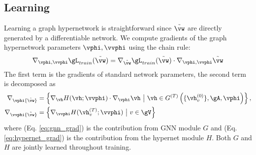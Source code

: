 \documentclass{article} %
\begin{document}
\subsection{Learning}
Learning a graph hypernetwork is straightforward since $\tilde{\vw}$ are directly generated by a
differentiable network. We compute gradients of the graph hypernetwork parameters $\vphi, \vvphi$
using the chain rule:
\begin{equation}
\nabla_{\vphi, \vvphi}{\gL_{train}(\tilde{\vw})} = \nabla_{\tilde{\vw}}{
\gL_{train}(\tilde{\vw})} \cdot \nabla_{\vphi, \vvphi}{\tilde{\vw}}
\end{equation}
The first term is the gradients of standard network parameters, the second term is decomposed as\begin{align}
 \nabla_\vphi{\tilde{\vw}} &= \left\{ \nabla_\vh H( \vh; \vvphi) \cdot \nabla_\vphi \vh \ \big| \ \vh \in G^{(T)} \left( \{\vh_v^{(0)}\}, \gA, \vphi \right) \right\}, \label{eq:gnn_grad}  \\ 
 \nabla_\vvphi{\tilde{\vw}} &= \left\{ \nabla_\vvphi H( \vh_v^{(T)}; \vvphi) \ \big| \ v \in \gV \right\} \label{eq:hypernet_grad}
\end{align}
where (Eq. \ref{eq:gnn_grad}) is the contribution from GNN module $G$ and (Eq.
\ref{eq:hypernet_grad}) is the contribution from the hypernet module $H$. Both $G$ and $H$ are
jointly learned throughout training.
\end{document}
